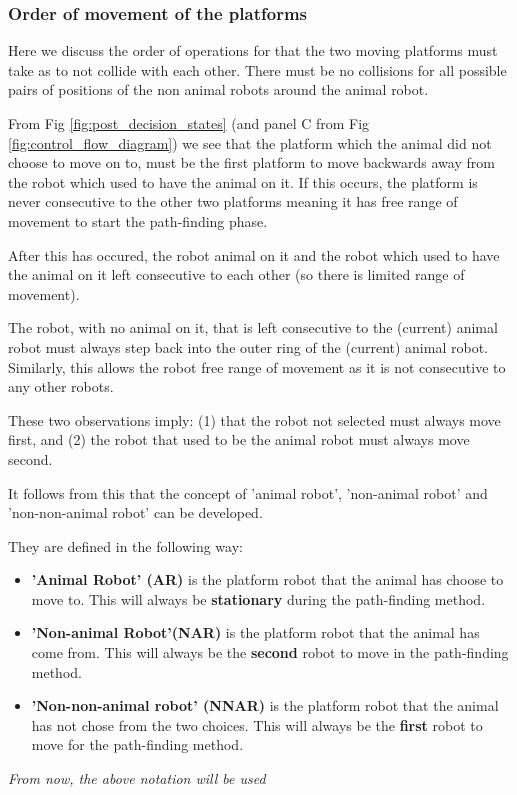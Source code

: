 \subsubsection{Order of movement of the platforms}
\label{section:order_of_operations}
Here we discuss the order of operations for that the two moving platforms must take as to not collide with each other. There must be no collisions for all possible pairs of positions of the non animal robots around the animal robot.

From Fig \ref{fig:post_decision_states} (and panel C from Fig \ref{fig:control_flow_diagram}) we see that the platform which the animal did not choose to move on to, must be the first platform to move backwards away from the robot which used to have the animal on it. If this occurs, the platform is never consecutive to the other two platforms meaning it has free range of movement to start the path-finding phase.

After this has occured, the robot animal on it and the robot which used to have the animal on it left consecutive to each other (so there is limited range of movement).

The robot, with no animal on it, that is left consecutive to the (current) animal robot must always step back into the outer ring of the (current) animal robot. Similarly, this allows the robot free range of movement as it is not consecutive to any other robots.

These two observations imply: (1) that the robot not selected must always move first, and (2) the robot that used to be the animal robot must always move second.

It follows from this that the concept of 'animal robot', 'non-animal robot' and 'non-non-animal robot' can be developed.
\begin{tcolorbox}
They are defined in the following way:
\begin{itemize}
    \item \textbf{'Animal Robot' (AR)} is the platform robot that the animal has choose to move to. This will always be \textbf{stationary} during the path-finding method.
    \item \textbf{'Non-animal Robot'(NAR)} is the platform robot that the animal has come from. This will always be the \textbf{second} robot to move in the path-finding method.
    \item \textbf{'Non-non-animal robot' (NNAR)} is the platform robot that the animal has not chose from the two choices. This will always be the \textbf{first} robot to move for the path-finding method.
\end{itemize}
\begin{center}
\textit{From now, the above notation will be used}
\end{center}
\end{tcolorbox}



